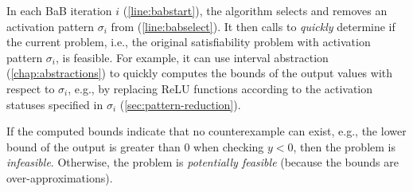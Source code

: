 \documentclass[oneside,11pt,dvipsnames]{book}
\numberwithin{equation}{section}
\theoremstyle{definition}
\theoremstyle{remark}
\begin{document}
In each BaB iteration $i$ (\autoref{line:babstart}), the algorithm selects and removes an activation pattern $\sigma_i$ from \problems (\autoref{line:babselect}).
It then calls \Deduce to \emph{quickly} determine if the current problem, i.e., the original satisfiability problem with  activation pattern $\sigma_i$,
is feasible. For example, it can use interval abstraction (\autoref{chap:abstractions}) to quickly computes the bounds of the output values with respect to $\sigma_i$, e.g., by replacing ReLU functions according to the activation statuses specified in $\sigma_i$ (\autoref{sec:pattern-reduction}).

If the computed bounds indicate that no counterexample can exist, e.g., the lower bound of the output is greater than 0 when checking $y < 0$, then the problem is \emph{infeasible}. Otherwise, the problem is \emph{potentially feasible} (because the bounds are over-approximations).
\end{document}
